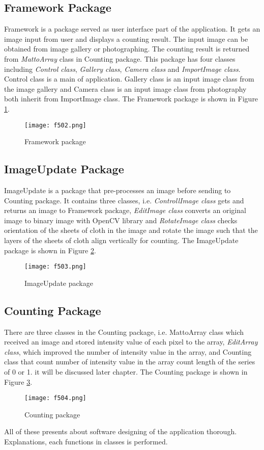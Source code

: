 \subsection{Framework Package}
Framework is a package served as user interface part of the application. It gets an image input from user and displays a counting result. The input image can be obtained from image gallery or photographing. The counting result is returned from \textit{MattoArray} class in Counting package. This package has four classes including \textit{Control class}, \textit{Gallery class}, \textit{Camera class} and \textit{ImportImage class}. Control class is a main of application. Gallery class is an input image class from the image gallery and Camera class is an input image class from photography both inherit from ImportImage class. The Framework package is shown in Figure \ref{fig:f502}.
\begin{figure}[t]
	\centering
	\texttt{[image: f502.png]}
	\caption{Framework package}
	\label{fig:f502}
\end{figure}

\subsection{ImageUpdate Package}
ImageUpdate is a package that pre-processes an image before sending to Counting package. It contains three classes, i.e. \textit{ControllImage class} gets and returns an image to Framework package, \textit{EditImage class} converts an original image to binary image with OpenCV library and \textit{RotateImage class} checks orientation of the sheets of cloth in the image and rotate the image such that the layers of the sheets of cloth align vertically for counting. The ImageUpdate package is shown in Figure \ref{fig:f503}.
\begin{figure}[t]
	\centering
	\texttt{[image: f503.png]}
	\caption{ImageUpdate package}
	\label{fig:f503}
\end{figure}

\subsection{Counting Package}
There are three classes in the Counting package, i.e. MattoArray class which received an image and stored intensity value of each pixel to the array, \textit{EditArray class}, which improved the number of intensity value in the array, and Counting class that count number of intensity value in the array count length of the series of 0 or 1. it will be discussed later chapter. The Counting package is shown in Figure \ref{fig:f504}.
\begin{figure}[t]
	\centering
	\texttt{[image: f504.png]}
	\caption{Counting package}
	\label{fig:f504}
\end{figure}

All of these presents about software designing of the application thorough.  Explanations, each functions in classes is performed. 
